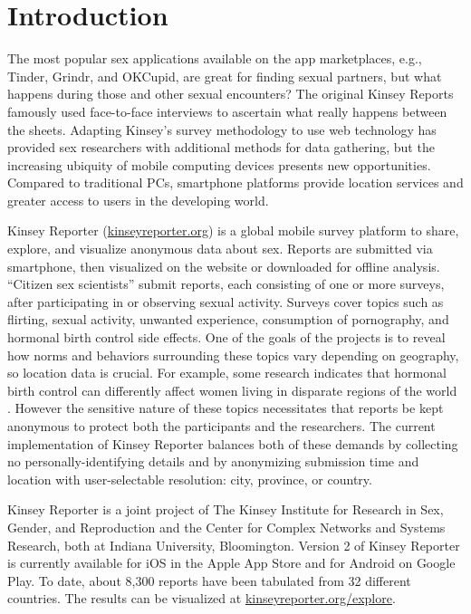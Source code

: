 \documentclass{sigchi}
\begin{document}
\section{Introduction}

The most popular sex applications available on the app marketplaces, e.g., Tinder, Grindr, and OKCupid, are great for finding sexual partners, but what happens during those and other sexual encounters? 
The original Kinsey Reports \cite{Kinsey1948, Kinsey1953} famously used face-to-face interviews to ascertain what really happens between the sheets. 
Adapting Kinsey's survey methodology to use web technology has provided sex researchers with additional methods for data gathering, but the increasing ubiquity of mobile computing devices presents new opportunities. Compared to traditional PCs, smartphone platforms provide location services and greater access to users in the developing world.



Kinsey Reporter (\url{kinseyreporter.org}) is a global mobile survey platform to share, explore, and visualize anonymous data about sex.
Reports are submitted via smartphone, then visualized on the website or downloaded for offline analysis.
``Citizen sex scientists'' submit reports, each consisting of one or more surveys, after participating in or observing sexual activity. 
Surveys cover topics such as flirting, sexual activity, unwanted experience, consumption of pornography, and hormonal birth control side effects.
One of the goals of the projects is to reveal how norms and behaviors surrounding these topics vary depending on geography, so location data is crucial.
For example, some research indicates that hormonal birth control can differently affect women living in disparate regions of the world \cite{Vitzthum2014}.
However the sensitive nature of these topics necessitates that reports be kept anonymous to protect both the participants and the researchers. The current implementation of Kinsey Reporter balances both of these demands by collecting no personally-identifying details and by anonymizing submission time and location with user-selectable resolution: city, province, or country.

Kinsey Reporter is a joint project of The Kinsey Institute for Research in Sex, Gender, and Reproduction and the Center for Complex Networks and Systems Research, both at Indiana University, Bloomington. 
Version 2 of Kinsey Reporter is currently available for iOS in the Apple App Store and for Android on Google Play. To date, about 
8,300 
reports have been tabulated from 
32 
different countries. The results can be visualized at \url{kinseyreporter.org/explore}.
\end{document}
